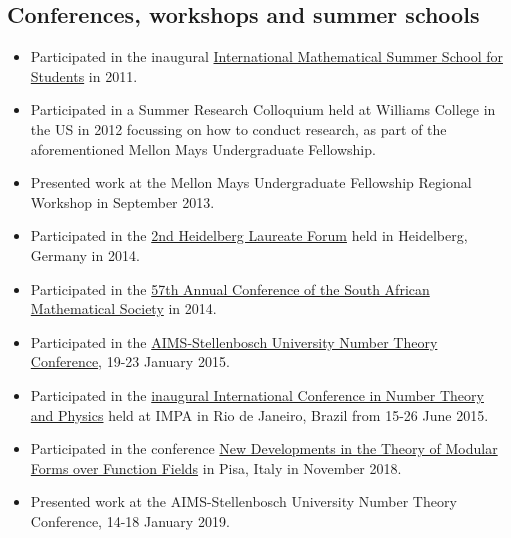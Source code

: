 \documentclass{article}
\begin{document}
\subsection{Conferences, workshops and summer schools}
\begin{itemize}
	\item Participated in the inaugural \href{http://math.jacobs-university.de/summerschool/2011}{International Mathematical Summer School for Students} in 2011.
	\item Participated in a Summer Research Colloquium held at Williams College in the US in 2012 focussing on how to conduct research, as part of the aforementioned Mellon Mays Undergraduate Fellowship.
	\item Presented work at the Mellon Mays Undergraduate Fellowship Regional Workshop in September 2013.
	\item Participated in the \href{http://www.heidelberg-laureate-forum.org/event_2014/}{2nd Heidelberg Laureate Forum} held in Heidelberg, Germany in 2014.
	\item Participated in the \href{http://www.unisa.ac.za/Default.asp?Cmd=ViewContent&ContentID=96795}{57th Annual Conference of the South African Mathematical Society} in 2014.
	\item Participated in the \href{http://www.aims.ac.za/en/research-centre/workshops-conferences/past/aims-stellenbosch-university-number-theory-conference-19-23-january-2015}{AIMS-Stellenbosch University Number Theory Conference}, 19-23 January 2015.
	\item Participated in the \href{http://www.impa.br/opencms/pt/eventos/store/evento_1504}{inaugural International Conference in Number Theory and Physics} held at IMPA in Rio de Janeiro, Brazil from 15-26 June 2015.
	\item Participated in the conference \href{https://dmvpisa2018.wordpress.com/}{New Developments in the Theory of Modular Forms over Function Fields} in Pisa, Italy in November 2018.
	\item Presented work at the AIMS-Stellenbosch University Number Theory Conference, 14-18 January 2019.
\end{itemize}
\end{document}
